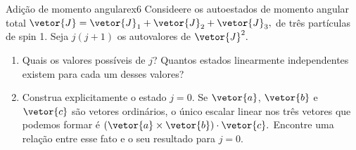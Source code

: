 \begin{exercício}{Adição de momento angular}{ex6}
    Consideere os autoestados de momento angular total \(\vetor{J} = \vetor{J}_1 + \vetor{J}_2 + \vetor{J}_3,\) de três partículas de spin 1. Seja \(j(j+1)\) os autovalores de \(\vetor{J}^2.\)
    \begin{enumerate}[label=(\alph*)]
        \item Quais os valores possíveis de \(j\)? Quantos estados linearmente independentes existem para cada um desses valores?
        \item Construa explicitamente o estado \(j = 0.\) Se \(\vetor{a}\), \(\vetor{b}\) e \(\vetor{c}\) são vetores ordinários, o único escalar linear nos três vetores que podemos formar é \((\vetor{a} \times \vetor{b}) \cdot \vetor{c}.\) Encontre uma relação entre esse fato e o seu resultado para \(j = 0.\)
    \end{enumerate}
\end{exercício}
